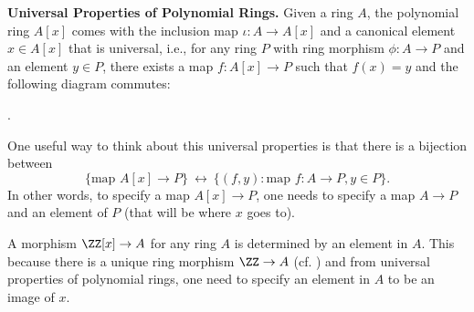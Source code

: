 \textbf{Universal Properties of Polynomial Rings.}
Given a ring $A$, the polynomial ring $A[x]$ comes with 
the inclusion map $\iota : A\to A[x]$ and a canonical element $x\in A[x]$ 
that is universal, i.e., for any ring $P$ with ring morphism 
$\phi : A\to P$ and an element $y\in P$,
there exists a map $f : A[x]\to P$ such that 
$f(x)=y$ and the following diagram commutes:
\begin{center}
.
\end{center}

One useful way to think about this universal properties 
is that there is a bijection between 
$$\{\text{map } A[x] \to P\} 
\ \longleftrightarrow\ 
\{(f,y) : \text{map } f : A\to P, y\in P\}.$$
In other words, to specify a map $A[x]\to P$,
one needs to specify a map $A\to P$ and an element of $P$ 
(that will be where $x$ goes to).

\begin{example}
A morphism $\ZZ[x]\to A$ for any ring $A$ 
is determined by an element in $A$. 
This because there is a unique ring morphism $\ZZ\to A$ 
(cf. ) and from universal properties 
of polynomial rings, one need to specify an element in $A$
to be an image of $x$.
\end{example}
